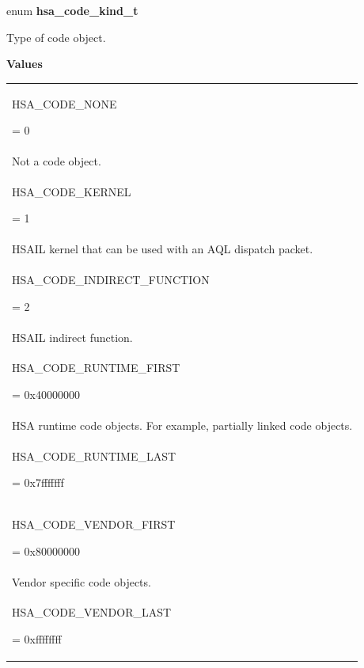 \documentclass[final]{book}
\newcommand{\reftyp}[1]{#1}
\newcommand{\refenu}[1]{\reftyp{#1}}
\begin{document}
\begin{appendices}
\noindent\begin{tcolorbox}[nobeforeafter,arc=0mm,colframe=white,colback=lightgray,left=0mm]
enum \hypertarget{group--FinalizerCoreApi-1ga085ebee59c730a7063cfe522b86f62d7}{\textbf{hsa_code_kind_t}}
\end{tcolorbox}
Type of code object.

\noindent\textbf{Values}\\[-5mm]
\begin{longtable}{@{\hspace{2em}}p{\linewidth-2em}}
\hspace{-2em}\hypertarget{group--FinalizerCoreApi-1gga085ebee59c730a7063cfe522b86f62d7aa5e4b3b31fa60a6e82a75da7a915bfed}{\refenu{HSA_CODE_NONE}} = 0\\Not a code object.\\[2mm]
\hspace{-2em}\hypertarget{group--FinalizerCoreApi-1gga085ebee59c730a7063cfe522b86f62d7a149263e0c0c1f1e47d6033706b195562}{\refenu{HSA_CODE_KERNEL}} = 1\\HSAIL kernel that can be used with an AQL dispatch packet.\\[2mm]
\hspace{-2em}\hypertarget{group--FinalizerCoreApi-1gga085ebee59c730a7063cfe522b86f62d7a97d94277d66e97010d1fb1c9a8229715}{\refenu{HSA_CODE_INDIRECT_FUNCTION}} = 2\\HSAIL indirect function.\\[2mm]
\hspace{-2em}\hypertarget{group--FinalizerCoreApi-1gga085ebee59c730a7063cfe522b86f62d7a20cae87c176364a1f10bb93c25838078}{\refenu{HSA_CODE_RUNTIME_FIRST}} = 0x40000000\\HSA runtime code objects. For example, partially linked code objects.\\[2mm]
\hspace{-2em}\hypertarget{group--FinalizerCoreApi-1gga085ebee59c730a7063cfe522b86f62d7a1c690669c518cf9f6140eef3a576da0c}{\refenu{HSA_CODE_RUNTIME_LAST}} = 0x7fffffff\\[2mm]
\hspace{-2em}\hypertarget{group--FinalizerCoreApi-1gga085ebee59c730a7063cfe522b86f62d7a55f790af92c9f3dd2975a94b14e934bc}{\refenu{HSA_CODE_VENDOR_FIRST}} = 0x80000000\\Vendor specific code objects.\\[2mm]
\hspace{-2em}\hypertarget{group--FinalizerCoreApi-1gga085ebee59c730a7063cfe522b86f62d7a06d7d8a2303db6de930646c03d9ec8f7}{\refenu{HSA_CODE_VENDOR_LAST}} = 0xffffffff
\end{longtable}


\end{appendices}
\end{document}
